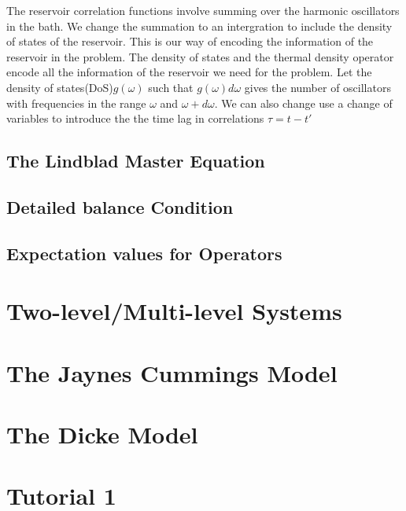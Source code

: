 \documentclass{scrartcl}
\newcommand{\1}{\mathbbm{1}}
\begin{document}
The reservoir correlation functions involve summing over the harmonic oscillators in the bath. We change the summation 
to an intergration to include the density of states of the reservoir. This is our way of encoding the 
information of the reservoir in the problem. The density of states and the thermal density operator encode 
all the information of the reservoir we need for the problem. Let the density of states(DoS)\(g(\omega)\) such that 
\(g(\omega) d\omega\) gives the number of oscillators with frequencies in the range \(\omega\) and \(\omega + d\omega\). We can also 
change use a change of variables to introduce the the time lag in correlations \(\tau = t-t'\)

\subsection{The Lindblad Master Equation}
\subsection{Detailed balance Condition}
\subsection{Expectation values for Operators}
\section{Two-level/Multi-level Systems}
\section{The Jaynes Cummings Model}
\section{The Dicke Model}
\section{Tutorial 1}
\end{document}
